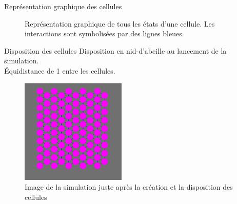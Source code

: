 \documentclass{beamer}
\begin{document}
\begin{frame}{Représentation graphique des cellules}
  \begin{figure}
    \caption{Représentation graphique de tous les états d'une cellule. Les interactions sont symbolisées par des lignes bleues.}
  \end{figure}
\end{frame}

\begin{frame}{Disposition des cellules}
  Disposition en nid-d'abeille au lancement de la simulation.\\
  Équidistance de 1 entre les cellules.
  \begin{center}
    \begin{figure}
      \includegraphics[width=5cm]{Images/hexagone.png}
      \caption{Image de la simulation juste après la création et la disposition des cellules}
    \end{figure}
  \end{center}
\end{frame}
\end{document}
